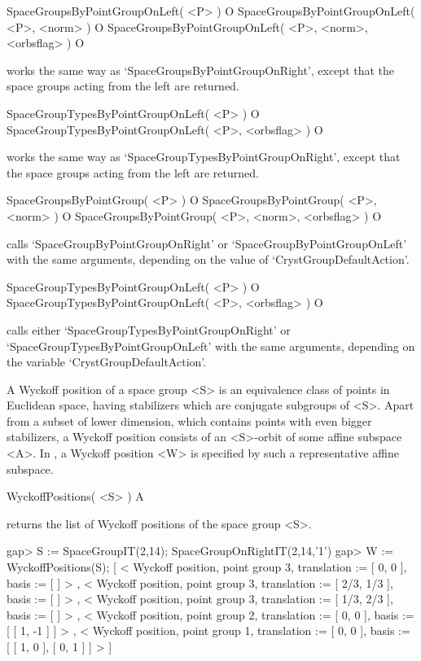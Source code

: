 \>SpaceGroupsByPointGroupOnLeft( <P> ) O
\>SpaceGroupsByPointGroupOnLeft( <P>, <norm> ) O
\>SpaceGroupsByPointGroupOnLeft( <P>, <norm>, <orbsflag> ) O

works the same way as `SpaceGroupsByPointGroupOnRight', except that
the space groups acting from the left are returned.

\>SpaceGroupTypesByPointGroupOnLeft( <P> ) O
\>SpaceGroupTypesByPointGroupOnLeft( <P>, <orbsflag> ) O

works the same way as `SpaceGroupTypesByPointGroupOnRight', except that
the space groups acting from the left are returned.

\>SpaceGroupsByPointGroup( <P> ) O
\>SpaceGroupsByPointGroup( <P>, <norm> ) O
\>SpaceGroupsByPointGroup( <P>, <norm>, <orbsflag> ) O

calls `SpaceGroupByPointGroupOnRight' or `SpaceGroupByPointGroupOnLeft' 
with the same arguments, depending on the value of `CrystGroupDefaultAction'.

\>SpaceGroupTypesByPointGroupOnLeft( <P> ) O
\>SpaceGroupTypesByPointGroupOnLeft( <P>, <orbsflag> ) O

calls either `SpaceGroupTypesByPointGroupOnRight' or
`SpaceGroupTypesByPointGroupOnLeft' with the same arguments, depending
on the variable `CrystGroupDefaultAction'.


A Wyckoff position of a space group <S> is an equivalence class of
points in Euclidean space, having stabilizers which are conjugate
subgroups of <S>.  Apart from a subset of lower dimension, which
contains points with even bigger stabilizers, a Wyckoff position
consists of an <S>-orbit of some affine subspace <A>. In {\Cryst},
a Wyckoff position <W> is specified by such a representative affine
subspace.

\>WyckoffPositions( <S> ) A

returns the list of Wyckoff positions of the space group <S>.

\beginexample
gap> S := SpaceGroupIT(2,14);
SpaceGroupOnRightIT(2,14,'1')
gap> W := WyckoffPositions(S);
[ < Wyckoff position, point group 3, translation := [ 0, 0 ], 
    basis := [  ] >
    , < Wyckoff position, point group 3, translation := [ 2/3, 1/3 ], 
    basis := [  ] >
    , < Wyckoff position, point group 3, translation := [ 1/3, 2/3 ], 
    basis := [  ] >
    , < Wyckoff position, point group 2, translation := [ 0, 0 ], 
    basis := [ [ 1, -1 ] ] >
    , < Wyckoff position, point group 1, translation := [ 0, 0 ], 
    basis := [ [ 1, 0 ], [ 0, 1 ] ] >
     ]
\endexample

